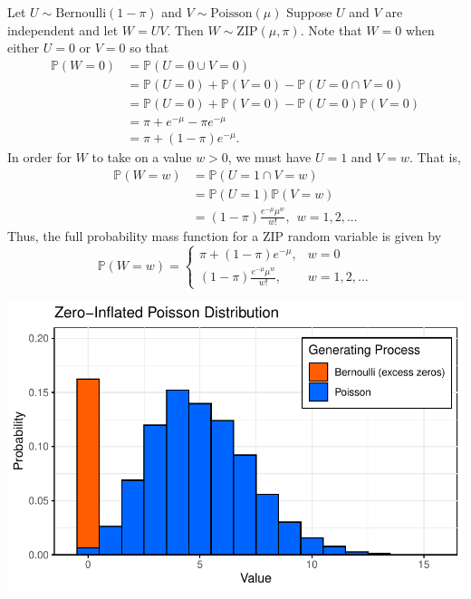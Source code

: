 \documentclass[
  12pt]{article}
\begin{document}
Let \(U \sim \text{Bernoulli}(1 - \pi)\) and
\(V \sim \text{Poisson}(\mu)\) Suppose \(U\) and \(V\) are independent
and let \(W = UV\). Then \(W \sim \text{ZIP}(\mu, \pi)\). Note that
\(W = 0\) when either \(U = 0\) or \(V = 0\) so that \[
\begin{aligned}
\mathbb{P}(W = 0) &= \mathbb{P}(U = 0 \cup V = 0) \\
                  &= \mathbb{P}(U = 0) + \mathbb{P}(V = 0) - \mathbb{P}(U = 0 \cap V = 0) \\
                  &= \mathbb{P}(U = 0) + \mathbb{P}(V = 0) - \mathbb{P}(U = 0)\mathbb{P}(V = 0) \\
                  &= \pi + e^{-\mu} - \pi e^{-\mu} \\ 
                  &= \pi + (1 - \pi)e^{-\mu}.
\end{aligned}
\] In order for \(W\) to take on a value \(w > 0\), we must have
\(U = 1\) and \(V = w\). That is, \[
\begin{aligned}
\mathbb{P}(W = w) &= \mathbb{P}(U = 1 \cap V = w) \\
                  &= \mathbb{P}(U = 1)\mathbb{P}(V = w) \\
                  &= (1-\pi)\frac{e^{-\mu}\mu^w}{w!}, \> \> w = 1, 2, ...
\end{aligned}
\] Thus, the full probability mass function for a ZIP random variable is
given by \[
\mathbb{P}(W = w) = \begin{cases}
               \pi + (1 - \pi)e^{-\mu}, &w =0 \\
               (1-\pi)\frac{e^{-\mu}\mu^w}{w!}, & w = 1, 2, ...
            \end{cases}
\]

\includegraphics{Paper_files/figure-pdf/unnamed-chunk-1-1.pdf}
\end{document}
